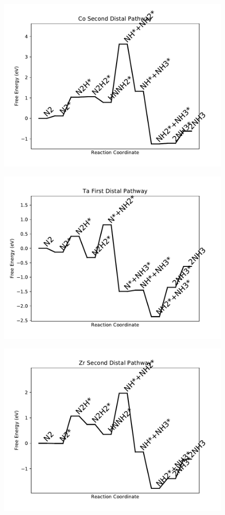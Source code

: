 \begin{figure}
\includegraphics[width=0.8\linewidth]{data/plots/Co_distal_2.pdf}
\end{figure}

\begin{figure}
\includegraphics[width=0.8\linewidth]{data/plots/Ta_distal_1.pdf}
\end{figure}

\begin{figure}
\includegraphics[width=0.8\linewidth]{data/plots/Zr_distal_2.pdf}
\end{figure}

